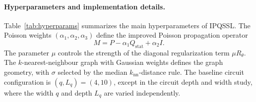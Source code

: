 \documentclass[11pt,a4paper]{article}
\begin{document}
\paragraph{Hyperparameters and implementation details.}
Table~\ref{tab:hyperparams} summarizes the main hyperparameters of IPQSSL.
The Poisson weights
\((\alpha_1,\alpha_2,\alpha_3)\) define the improved Poisson propagation
operator
\[
M
=
P-\alpha_1Q_{\mathrm{stat}}+\alpha_2I.
\]
The parameter \(\mu\) controls the strength of the diagonal
regularization term \(\mu R_\theta\). The
\(k\)-nearest-neighbour graph with Gaussian weights defines the
graph geometry, with \(\sigma\) selected by the median
\(k_{\mathrm{nn}}\)-distance rule. The baseline circuit configuration is
\((q,L_q)=(4,10)\), except in the circuit depth and width study, where the
width \(q\) and depth \(L_q\) are varied independently.
\end{document}
